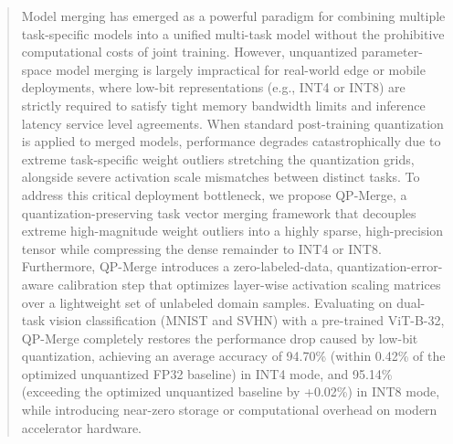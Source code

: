 \begin{abstract}
Model merging has emerged as a powerful paradigm for combining multiple task-specific models into a unified multi-task model without the prohibitive computational costs of joint training. However, unquantized parameter-space model merging is largely impractical for real-world edge or mobile deployments, where low-bit representations (e.g., INT4 or INT8) are strictly required to satisfy tight memory bandwidth limits and inference latency service level agreements. When standard post-training quantization is applied to merged models, performance degrades catastrophically due to extreme task-specific weight outliers stretching the quantization grids, alongside severe activation scale mismatches between distinct tasks. To address this critical deployment bottleneck, we propose QP-Merge, a quantization-preserving task vector merging framework that decouples extreme high-magnitude weight outliers into a highly sparse, high-precision tensor while compressing the dense remainder to INT4 or INT8. Furthermore, QP-Merge introduces a zero-labeled-data, quantization-error-aware calibration step that optimizes layer-wise activation scaling matrices over a lightweight set of unlabeled domain samples. Evaluating on dual-task vision classification (MNIST and SVHN) with a pre-trained ViT-B-32, QP-Merge completely restores the performance drop caused by low-bit quantization, achieving an average accuracy of 94.70\% (within 0.42\% of the optimized unquantized FP32 baseline) in INT4 mode, and 95.14\% (exceeding the optimized unquantized baseline by +0.02\%) in INT8 mode, while introducing near-zero storage or computational overhead on modern accelerator hardware.
\end{abstract}
